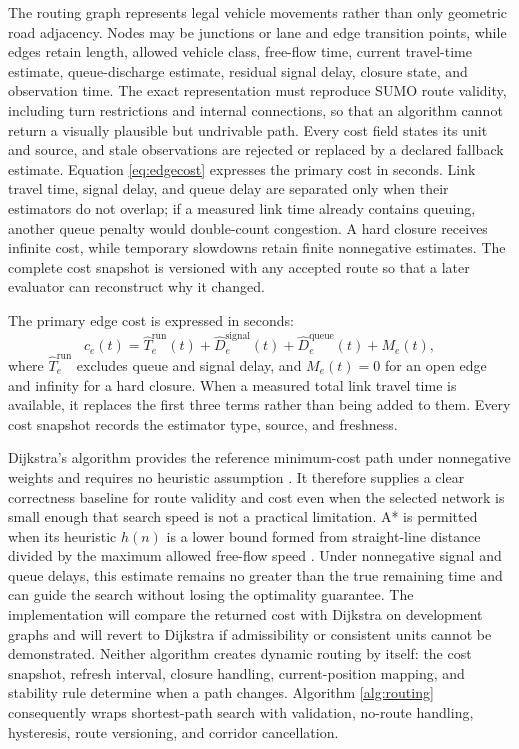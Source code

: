 The routing graph represents legal vehicle movements rather than only geometric road adjacency. Nodes may be junctions or lane and edge transition points, while edges retain length, allowed vehicle class, free-flow time, current travel-time estimate, queue-discharge estimate, residual signal delay, closure state, and observation time. The exact representation must reproduce SUMO route validity, including turn restrictions and internal connections, so that an algorithm cannot return a visually plausible but undrivable path. Every cost field states its unit and source, and stale observations are rejected or replaced by a declared fallback estimate. Equation \ref{eq:edgecost} expresses the primary cost in seconds. Link travel time, signal delay, and queue delay are separated only when their estimators do not overlap; if a measured link time already contains queuing, another queue penalty would double-count congestion. A hard closure receives infinite cost, while temporary slowdowns retain finite nonnegative estimates. The complete cost snapshot is versioned with any accepted route so that a later evaluator can reconstruct why it changed.

The primary edge cost is expressed in seconds:
\begin{equation}
c_e(t)=\hat{T}^{\mathrm{run}}_e(t)+\hat{D}^{\mathrm{signal}}_e(t)+\hat{D}^{\mathrm{queue}}_e(t)+M_e(t),
\label{eq:edgecost}
\end{equation}
where $\hat{T}^{\mathrm{run}}_e$ excludes queue and signal delay, and $M_e(t)=0$ for an open edge and infinity for a hard closure. When a measured total link travel time is available, it replaces the first three terms rather than being added to them. Every cost snapshot records the estimator type, source, and freshness.

Dijkstra's algorithm provides the reference minimum-cost path under nonnegative weights and requires no heuristic assumption \cite{dijkstra1959}. It therefore supplies a clear correctness baseline for route validity and cost even when the selected network is small enough that search speed is not a practical limitation. A* is permitted when its heuristic $h(n)$ is a lower bound formed from straight-line distance divided by the maximum allowed free-flow speed \cite{hart1968astar}. Under nonnegative signal and queue delays, this estimate remains no greater than the true remaining time and can guide the search without losing the optimality guarantee. The implementation will compare the returned cost with Dijkstra on development graphs and will revert to Dijkstra if admissibility or consistent units cannot be demonstrated. Neither algorithm creates dynamic routing by itself: the cost snapshot, refresh interval, closure handling, current-position mapping, and stability rule determine when a path changes. Algorithm \ref{alg:routing} consequently wraps shortest-path search with validation, no-route handling, hysteresis, route versioning, and corridor cancellation.

